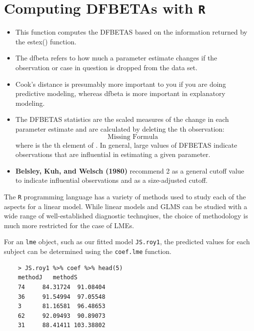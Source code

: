 \documentclass[12pt, a4paper]{report}
\theoremstyle{plain}
\theoremstyle{definition}
\theoremstyle{remark}
\begin{document}
	
	
	\section{Computing DFBETAs with \texttt{R}}
	
	\begin{itemize}
		\item This function computes the DFBETAS based on the information returned by the estex() function.
		\item The dfbeta refers to how much a parameter estimate changes if the observation or case in question is dropped from the data set.  
		\item Cook's distance is presumably more important to you if you are doing predictive modeling, whereas dfbeta is more important in explanatory modeling.
		
		\item The DFBETAS statistics are the scaled measures of the change in each parameter estimate and are calculated by deleting the th observation:
		\[ \mbox{Missing Formula}\]
		where  is the th element of .
		In general, large values of DFBETAS indicate observations that are influential in estimating a given parameter. \item \textbf{Belsley, Kuh, and Welsch (1980)} recommend 2 as a general cutoff value to indicate influential observations and  as a size-adjusted cutoff.
	\end{itemize}
	

	
	
	
The \texttt{R} programming language has a variety of methods used to study each of the aspects for a linear model. While linear models and GLMS can be studied with a wide range of well-established diagnostic technqiues, the choice of methodology is much more restricted for the case of LMEs.

For an \texttt{lme} object, such as our fitted model \texttt{JS.roy1}, the predicted values for each subject can be determined using the \texttt{coef.lme} function.
\begin{framed}
	\begin{verbatim}
	> JS.roy1 %>% coef %>% head(5)
	methodJ   methodS
	74     84.31724  91.08404
	36     91.54994  97.05548
	3      81.16581  96.48653
	62     92.09493  90.89073
	31     88.41411 103.38802
	\end{verbatim}
\end{framed}
\end{document}
